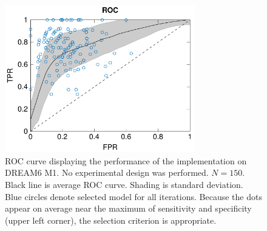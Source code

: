 \documentclass{bioinfo}
\begin{document}
\begin{figure}[!tpb]%
\centerline{\includegraphics[width=235pt]{Figures/ROC.pdf}}
\caption{ROC curve displaying the performance of the implementation on DREAM6 M1. No experimental design was performed. $N = 150$. Black line is average ROC curve. Shading is standard deviation. Blue circles denote selected model for all iterations. Because the dots appear on average near the maximum of sensitivity and specificity (upper left corner), the selection criterion is appropriate.}\label{fig:01}
\end{figure}


\end{document}
